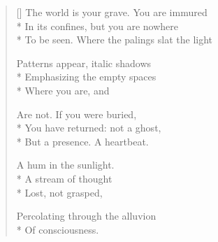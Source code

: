 \label{ch:palimpsest}
\settowidth{\versewidth}{To be seen. Where the palings slat the light}
\begin{verse}[\versewidth]
The world is your grave. You are immured\\*
In its confines, but you are nowhere\\*
To be seen. Where the palings slat the light

Patterns appear, italic shadows\\*
Emphasizing the empty spaces\\*
Where you are, and

Are not. If you were buried,\\*
You have returned: not a ghost, \\*
But a presence.   A heartbeat.

A hum in the sunlight.   \\*
A stream of thought\\*
Lost, not grasped, 

Percolating through the alluvion \\*
Of consciousness.
\end{verse}
